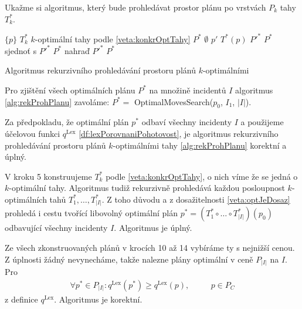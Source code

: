 Ukažme si algoritmus, který bude prohledávat prostor plánu po vrstvách $P_k$ tahy $T^*_k$.

\begin{algorithm}[h]
  \begin{algorithmic}[1]
      \State \Return $\{ p \}$
    \EndIf
    \State $T^*_k$ \gets $k$-optimální tahy podle \ref{veta:konkrOptTahy}
    \State $P^*$ \gets $\emptyset$
      \State $p'$ \gets $T^*(p)$
      \State $P'^*$ \gets {}
        \State $P^*$ sjednoť s $P'^*$
        \State $P^*$ nahraď $P'^*$
      \EndIf
    \EndFor
    \State \Return $P^*$
  \EndFunction
  \end{algorithmic}
  \caption{Algoritmus rekurzivního prohledávání prostoru plánů $k$-optimálními}
  \label{alg:rekProhPlanu}
\end{algorithm}

Pro zjištění všech optimálních plánu $P^*$ na množině incidentů $I$ algoritmus \ref{alg:rekProhPlanu} zavoláme: $P^* = $ OptimalMovesSearch($p_0$, $I_1$, $|I|$).

\begin{veta}
  Za předpokladu, že optimální plán $p^*$ odbaví všechny incidenty $I$ a použijeme účelovou funkci $q^{\text{Lex}}$ \ref{df:lexPorovnaniPohotovost},
  je algoritmus rekurzivního prohledávání prostoru plánů $k$-optimálními tahy \ref{alg:rekProhPlanu} korektní a úplný.
\end{veta}
\begin{dukaz}
  V kroku 5 konstruujeme $T^*_k$ podle \ref{veta:konkrOptTahy}, o nich víme že se jedná o $k$-optimální tahy.
  Algoritmus tudiž rekurzivně prohledává každou posloupnost $k$-optimálních tahů $T^*_1, \dots, T^*_{|I|}$.
  Z toho důvodu a z dosažitelnosti \ref{veta:optJeDosaz} prohledá i cestu tvořící libovolný optimální plán $p^* = (T^*_1 \circ \dots \circ T^*_{|I|})(p_0)$ odbavující všechny incidenty $I$.
  Algoritmus je úplný.

  Ze všech zkonstruovaných plánů v krocích 10 až 14 vybíráme ty s nejnižší cenou.
  Z úplnosti žádný nevynecháme, takže nalezne plány optimální v ceně $P_{|I|}$ na $I$.
  Pro
  \begin{alignat*}
    \forall p^* \in P_{|I|} \colon q^{\text{Lex}}(p^*) \geq q^{\text{Lex}}(p), \quad && p \in P_C
  \end{alignat*}
  z definice $q^{\text{Lex}}$. Algoritmus je korektní.
\end{dukaz}

